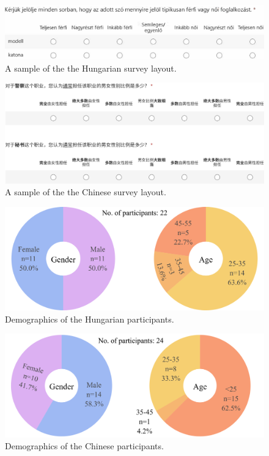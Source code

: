 \documentclass[11pt]{article}
\begin{document}
\begin{figure}[!ht]
  \centering
  \includegraphics[width=\linewidth]{../survey_hu}
  \caption{A sample of the the Hungarian survey layout.}
  \label{fig:survey_hu}
\end{figure}

\begin{figure}[!ht]
  \centering
  \includegraphics[width=\linewidth]{../survey_zh}
  \caption{A sample of the the Chinese survey layout.}
  \label{fig:survey_zh}
\end{figure}




\begin{figure}[!ht]
  \centering
  \includegraphics[width=\linewidth]{../demographics_hu}
  \caption{Demographics of the Hungarian participants.}
  \label{fig:demographics_hu}
\end{figure}

\begin{figure}[!ht]
  \centering
  \includegraphics[width=\linewidth]{../demographics_zh}
  \caption{Demographics of the Chinese participants.}
  \label{fig:demographics_zh}
\end{figure}
\end{document}
